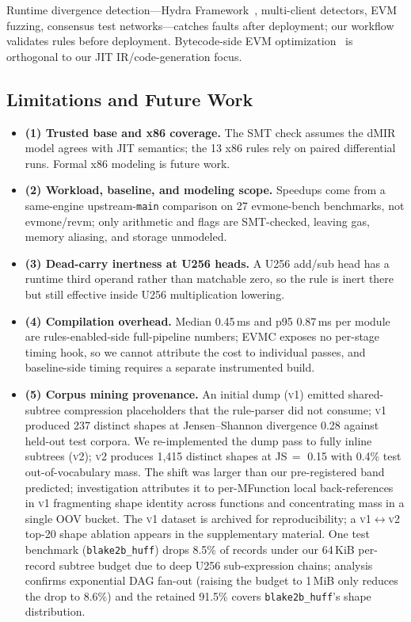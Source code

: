 {\sloppy
Runtime divergence detection---Hydra Framework~\cite{hydra_framework},
multi-client detectors, EVM fuzzing, consensus test networks---catches
faults after deployment; our workflow validates rules before deployment.
Bytecode-side EVM
optimization~\cite{maxsmt_evm,vmil24_superinst,ist25_neural_superopt,jar25_proof_producing,scico24_translation_cert}
is orthogonal to our JIT IR/code-generation focus.\par}

\subsection{Limitations and Future Work}
\label{sec:limitations}

\begin{itemize}[leftmargin=0.8em,labelsep=0.35em,itemsep=-1pt,topsep=0pt]
\item \textbf{(1) Trusted base and x86 coverage.} The SMT check assumes
the dMIR model agrees with JIT semantics; the 13 x86 rules rely on paired
differential runs. Formal x86 modeling is future work.
\item \textbf{(2) Workload, baseline, and modeling scope.} Speedups come
from a same-engine upstream-\texttt{main} comparison on 27 evmone-bench
benchmarks, not evmone/revm; only arithmetic and flags are SMT-checked,
leaving gas, memory aliasing, and storage unmodeled.
\item \textbf{(3) Dead-carry inertness at U256 heads.} A U256 add/sub
head has a runtime third operand rather than matchable zero, so the rule
is inert there but still effective inside U256 multiplication lowering.
\item \textbf{(4) Compilation overhead.} Median 0.45\,ms and p95
0.87\,ms per module are rules-enabled-side full-pipeline numbers; EVMC
exposes no per-stage timing hook, so we cannot attribute the cost to
individual passes, and baseline-side timing requires a separate
instrumented build.
\item \textbf{(5) Corpus mining provenance.} An initial dump
(\textsc{v1}) emitted shared-subtree compression placeholders that the
rule-parser did not consume; \textsc{v1} produced 237 distinct shapes
at Jensen--Shannon divergence 0.28 against held-out test corpora.
We re-implemented the dump pass to fully inline subtrees
(\textsc{v2}); \textsc{v2} produces 1{,}415 distinct shapes at
JS\,$=\,$\,0.15 with 0.4\% test out-of-vocabulary mass. The shift was
larger than our pre-registered band predicted; investigation
attributes it to per-MFunction local back-references in \textsc{v1}
fragmenting shape identity across functions and concentrating mass in
a single OOV bucket. The \textsc{v1} dataset is archived for
reproducibility; a \textsc{v1}$\leftrightarrow$\textsc{v2} top-20
shape ablation appears in the supplementary material. One test
benchmark (\texttt{blake2b\_huff}) drops 8.5\% of records under our
64\,KiB per-record subtree budget due to deep U256 sub-expression
chains; analysis confirms exponential DAG fan-out (raising the budget
to 1\,MiB only reduces the drop to 8.6\%) and the retained 91.5\%
covers \texttt{blake2b\_huff}'s shape distribution.
\end{itemize}
